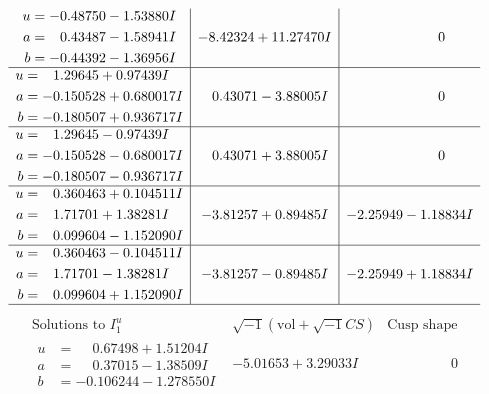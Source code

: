 \documentclass[1p]{elsarticle_modified}
\theoremstyle{definition}
\newcommand{\I}{\sqrt{-1}}
\begin{document}
$$\begin{array}{c|c|c}
\begin{aligned}
u &= -0.48750 - 1.53880 I \\
a &= \phantom{-}0.43487 - 1.58941 I \\
b &= -0.44392 - 1.36956 I\end{aligned}
 & -8.42324 + 11.27470 I & \phantom{-0.000000 } 0 \\ \hline\begin{aligned}
u &= \phantom{-}1.29645 + 0.97439 I \\
a &= -0.150528 + 0.680017 I \\
b &= -0.180507 + 0.936717 I\end{aligned}
 & \phantom{-}0.43071 - 3.88005 I & \phantom{-0.000000 } 0 \\ \hline\begin{aligned}
u &= \phantom{-}1.29645 - 0.97439 I \\
a &= -0.150528 - 0.680017 I \\
b &= -0.180507 - 0.936717 I\end{aligned}
 & \phantom{-}0.43071 + 3.88005 I & \phantom{-0.000000 } 0 \\ \hline\begin{aligned}
u &= \phantom{-}0.360463 + 0.104511 I \\
a &= \phantom{-}1.71701 + 1.38281 I \\
b &= \phantom{-}0.099604 - 1.152090 I\end{aligned}
 & -3.81257 + 0.89485 I & -2.25949 - 1.18834 I \\ \hline\begin{aligned}
u &= \phantom{-}0.360463 - 0.104511 I \\
a &= \phantom{-}1.71701 - 1.38281 I \\
b &= \phantom{-}0.099604 + 1.152090 I\end{aligned}
 & -3.81257 - 0.89485 I & -2.25949 + 1.18834 I\\
 \hline 
 \end{array}$$\newpage$$\begin{array}{c|c|c}  
\text{Solutions to }I^u_{1}& \I (\text{vol} + \sqrt{-1}CS) & \text{Cusp shape}\\
 \hline 
\begin{aligned}
u &= \phantom{-}0.67498 + 1.51204 I \\
a &= \phantom{-}0.37015 - 1.38509 I \\
b &= -0.106244 - 1.278550 I\end{aligned}
 & -5.01653 + 3.29033 I & \phantom{-0.000000 } 0 \\ \hline\begin{aligned}

\end{aligned}
\end{array}$$
\end{document}
